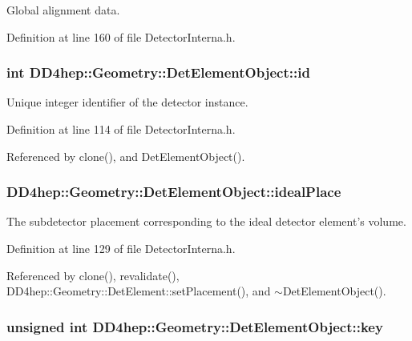 Global alignment data. 

Definition at line 160 of file DetectorInterna.h.\hypertarget{class_d_d4hep_1_1_geometry_1_1_det_element_object_a32d2a3f77fa7afde62ad5d08aa14919f}{
\subsubsection[{id}]{\setlength{\rightskip}{0pt plus 5cm}int {\bf DD4hep::Geometry::DetElementObject::id}}}
\label{class_d_d4hep_1_1_geometry_1_1_det_element_object_a32d2a3f77fa7afde62ad5d08aa14919f}


Unique integer identifier of the detector instance. 

Definition at line 114 of file DetectorInterna.h.

Referenced by clone(), and DetElementObject().\hypertarget{class_d_d4hep_1_1_geometry_1_1_det_element_object_a343542db3151374647357978d11b9b68}{
\subsubsection[{idealPlace}]{ {\bf DD4hep::Geometry::DetElementObject::idealPlace}}}
\label{class_d_d4hep_1_1_geometry_1_1_det_element_object_a343542db3151374647357978d11b9b68}


The subdetector placement corresponding to the ideal detector element's volume. 

Definition at line 129 of file DetectorInterna.h.

Referenced by clone(), revalidate(), DD4hep::Geometry::DetElement::setPlacement(), and $\sim$DetElementObject().\hypertarget{class_d_d4hep_1_1_geometry_1_1_det_element_object_a77994e3dcc6416eadd3be577c46a8e29}{
\subsubsection[{key}]{\setlength{\rightskip}{0pt plus 5cm}unsigned int {\bf DD4hep::Geometry::DetElementObject::key}}}
\label{class_d_d4hep_1_1_geometry_1_1_det_element_object_a77994e3dcc6416eadd3be577c46a8e29}


